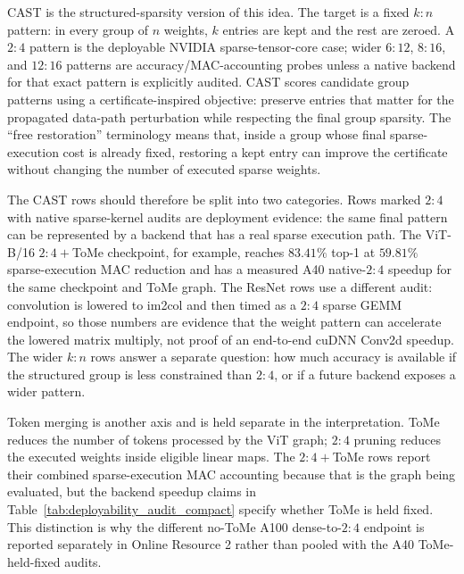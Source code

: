 \documentclass[11pt]{article}
\theoremstyle{plain}
\theoremstyle{definition}
\theoremstyle{remark}
\newcommand{\1}{\mathbf{1}}
\begin{document}
CAST is the structured-sparsity version of this idea.  The target is a fixed \(k{:}n\) pattern: in every group of \(n\) weights, \(k\) entries are kept and the rest are zeroed.  A \(2{:}4\) pattern is the deployable NVIDIA sparse-tensor-core case; wider \(6{:}12\), \(8{:}16\), and \(12{:}16\) patterns are accuracy/MAC-accounting probes unless a native backend for that exact pattern is explicitly audited.  CAST scores candidate group patterns using a certificate-inspired objective: preserve entries that matter for the propagated data-path perturbation while respecting the final group sparsity.  The ``free restoration'' terminology means that, inside a group whose final sparse-execution cost is already fixed, restoring a kept entry can improve the certificate without changing the number of executed sparse weights.

The CAST rows should therefore be split into two categories.  Rows marked \(2{:}4\) with native sparse-kernel audits are deployment evidence: the same final pattern can be represented by a backend that has a real sparse execution path.  The ViT-B/16 \(2{:}4{+}\)ToMe checkpoint, for example, reaches \(83.41\%\) top-1 at \(59.81\%\) sparse-execution MAC reduction and has a measured A40 native-\(2{:}4\) speedup for the same checkpoint and ToMe graph.  The ResNet rows use a different audit: convolution is lowered to im2col and then timed as a \(2{:}4\) sparse GEMM endpoint, so those numbers are evidence that the weight pattern can accelerate the lowered matrix multiply, not proof of an end-to-end cuDNN Conv2d speedup.  The wider \(k{:}n\) rows answer a separate question: how much accuracy is available if the structured group is less constrained than \(2{:}4\), or if a future backend exposes a wider pattern.

Token merging is another axis and is held separate in the interpretation.  ToMe reduces the number of tokens processed by the ViT graph; \(2{:}4\) pruning reduces the executed weights inside eligible linear maps.  The \(2{:}4{+}\)ToMe rows report their combined sparse-execution MAC accounting because that is the graph being evaluated, but the backend speedup claims in Table~\ref{tab:deployability_audit_compact} specify whether ToMe is held fixed.  This distinction is why the different no-ToMe A100 dense-to-\(2{:}4\) endpoint is reported separately in Online Resource 2 rather than pooled with the A40 ToMe-held-fixed audits.
\end{document}
